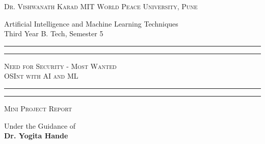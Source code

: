 \documentclass[openany]{report}
\begin{document}
\begin{titlepage}
    \centering


    \huge\textsc{
        Dr. Vishwanath Karad MIT World Peace University, Pune
    }\\

    \vspace{0.75\baselineskip} %

    \LARGE{
        Artificial Intelligence and Machine Learning Techniques\\
        Third Year B. Tech, Semester 5\\
    }

    \vfill %


    \rule{\textwidth}{1.6pt}\vspace*{-\baselineskip}\vspace*{2pt}
    \rule{\textwidth}{0.6pt}
    \vspace{0.75\baselineskip} %



    \huge{\textsc{
            Need for Security - Most Wanted\\
            OSInt with AI and ML
        }} \\



    \vspace{0.5\baselineskip} %
    \rule{\textwidth}{0.6pt}\vspace*{-\baselineskip}\vspace*{2.8pt}
    \rule{\textwidth}{1.6pt}

    \vspace{1\baselineskip} %


    \LARGE\textsc{
        Mini Project Report
    } %


    \vspace{0.5\baselineskip} %
    Under the Guidance of\\
    \Large{
        \textbf{Dr. Yogita Hande}
    }
    \vfill


\end{titlepage}
\end{document}
